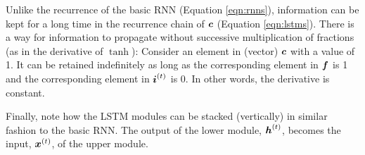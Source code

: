 
Unlike the recurrence of the basic RNN (Equation \ref{eqn:rnns}), information can be kept for a long time in the recurrence chain of $\boldsymbol{c}$ (Equation \ref{eqn:lstms}). 
%
There is a way for information to propagate without successive multiplication of fractions (as in the derivative of $\tanh$):
%
Consider an element in (vector) $\boldsymbol{c}$ with a value of 1.
%
It can be retained indefinitely as long as the corresponding element in $\boldsymbol{f}$ is 1 and the corresponding element in $\boldsymbol{i}\sp{(t)}$ is 0.
%
In other words, the derivative is constant.

Finally, note how the LSTM modules can be stacked (vertically) in similar fashion to the basic RNN.
%
The output of the lower module, $\boldsymbol{h}\sp{(t)}$, becomes the input, $\boldsymbol{x}\sp{(t)}$, of the upper module.




